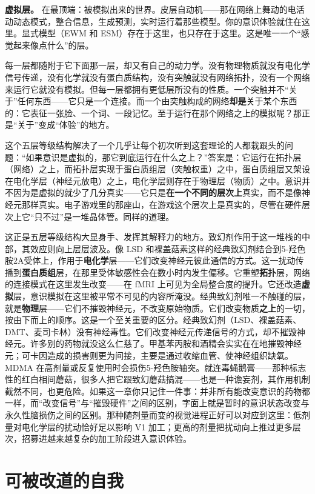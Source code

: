 \documentclass[11pt, twoside, openright]{book}
\begin{document}
\textbf{虚拟层。} 在最顶端：被模拟出来的世界。皮层自动机------那在网络上舞动的电活动动态模式，整合信息，生成预测，实时运行着那些模型。你的意识体验就住在这里。显式模型（EWM 和 ESM）存在于这里，也只存在于这里。这是唯一一个“感觉起来像点什么”的层。

每一层都随附于它下面那一层，却又有自己的动力学。没有物理物质就没有电化学信号传递，没有化学就没有蛋白质结构，没有突触就没有网络拓扑，没有一个网络来运行它就没有模拟。但每一层都拥有更低层所没有的性质。一个突触并不“关于”任何东西------它只是一个连接。而一个由突触构成的网络\textbf{却是}关于某个东西的：它表征一张脸、一个词、一段记忆。至于运行在那个网络之上的模拟呢？那正是“关于”变成“体验”的地方。

这个五层等级结构解决了一个几乎让每个初次听到这套理论的人都栽跟头的问题：“如果意识是虚拟的，那它到底运行在什么之上？”答案是：它运行在拓扑层（网络）之上，而拓扑层实现于蛋白质组层（突触权重）之中，蛋白质组层又架设在电化学层（神经元放电）之上，电化学层则存在于物理层（物质）之中。意识并不因为是虚拟的就少了几分真实------它只是\textbf{在一个不同的层次上}真实，而不是像神经元那样真实。电子游戏里的那座山，在游戏这个层次上是真实的，尽管在硬件层次上它“只不过”是一堆晶体管。同样的道理。

这正是五层等级结构大显身手、发挥其解释力的地方。致幻剂作用于这一堆栈的中部，其效应则向上层层波及。像 LSD 和裸盖菇素这样的经典致幻剂结合到5-羟色胺2A受体上，作用于\textbf{电化学}层------它们改变神经元彼此通信的方式。这一扰动传播到\textbf{蛋白质组}层，在那里受体敏感性会在数小时内发生偏移。它重塑\textbf{拓扑}层，网络的连接模式在这里发生改变------在 fMRI 上可见为全局整合度的提升。它还改造\textbf{虚拟}层，意识模拟在这里被平常不可见的内容所淹没。经典致幻剂唯一不触碰的层，就是\textbf{物理}层------它们不摧毁神经元，不改变原始物质。它们改变物质\textbf{之上}的一切，按由下而上的顺序。这是一个至关重要的区分。经典致幻剂（LSD、裸盖菇素、DMT、麦司卡林）没有神经毒性。它们改变神经元传递信号的方式，却不摧毁神经元。许多别的药物就没这么仁慈了。甲基苯丙胺和酒精会实实在在地摧毁神经元；可卡因造成的损害则更为间接，主要是通过收缩血管、使神经组织缺氧。MDMA 在高剂量或反复使用时会损伤5-羟色胺轴突。就连毒蝇鹅膏------那种标志性的红白相间蘑菇，很多人把它跟致幻蘑菇搞混------也是一种谵妄剂，其作用机制截然不同，也更危险。如果这一章你只记住一件事：并非所有能改变意识的药物都一样，而“改变信号”与“摧毁硬件”之间的区别，字面上就是暂时的意识状态改变与永久性脑损伤之间的区别。那种随剂量而变的视觉进程正好可以对应到这里：低剂量对电化学层的扰动恰好足以影响 V1 加工；更高的剂量把扰动向上推过更多层次，招募进越来越复杂的加工阶段进入意识体验。

\section*{可被改道的自我}
\end{document}
